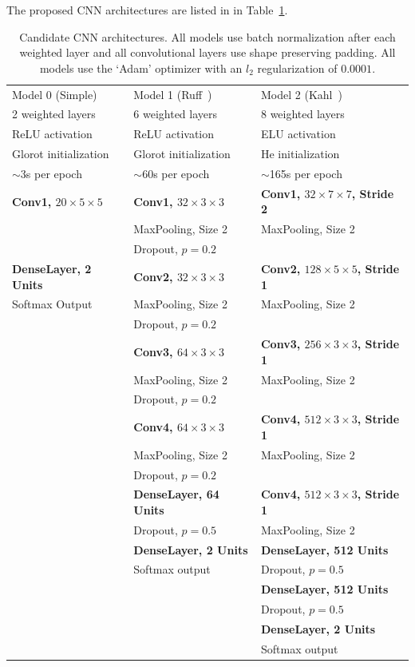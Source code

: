 The proposed CNN architectures are listed in in
Table~\ref{table:cnn_architectures}.

\begin{table}[ht]
\begin{center}
\begin{tabular}{l l l}
\toprule
Model 0 (Simple) & Model 1 (Ruff~\cite{ruff2020automated}) & Model 2 (Kahl~\cite{kahl2017large}) \\[0.5ex]
2 weighted layers & 6 weighted layers & 8 weighted layers \\[0.5ex]
ReLU activation & ReLU activation & ELU activation \\[0.5ex]
Glorot initialization & Glorot initialization & He initialization \\[0.5ex]
$\sim$3s per epoch & $\sim$60s per epoch & $\sim$165s per epoch \\[0.5ex]
\midrule
\textbf{Conv1, $20 \times 5 \times 5$} &
\textbf{Conv1, $32 \times 3 \times 3$} &
\textbf{Conv1, $32 \times 7 \times 7$, Stride 2} \\
& MaxPooling, Size 2 & MaxPooling, Size 2 \\
& Dropout, $p=0.2$ & \\[1ex]
\textbf{DenseLayer, 2 Units} &
\textbf{Conv2, $32 \times 3 \times 3$} &
\textbf{Conv2, $128 \times 5 \times 5$, Stride 1} \\
Softmax Output & MaxPooling, Size 2 & MaxPooling, Size 2 \\
& Dropout, $p=0.2$ & \\[1ex]
& \textbf{Conv3, $64 \times 3 \times 3$} &
\textbf{Conv3, $256 \times 3 \times 3$, Stride 1} \\
& MaxPooling, Size 2 & MaxPooling, Size 2 \\
& Dropout, $p=0.2$ & \\[1ex]
& \textbf{Conv4, $64 \times 3 \times 3$} &
\textbf{Conv4, $512 \times 3 \times 3$, Stride 1} \\
& MaxPooling, Size 2 & MaxPooling, Size 2 \\
& Dropout, $p=0.2$ & \\[1ex]
& \textbf{DenseLayer, 64 Units} &
\textbf{Conv4, $512 \times 3 \times 3$, Stride 1} \\
& Dropout, $p=0.5$ & MaxPooling, Size 2 \\[1ex]
& \textbf{DenseLayer, 2 Units} &
\textbf{DenseLayer, 512 Units} \\
& Softmax output & Dropout, $p=0.5$ \\[1ex]
& & \textbf{DenseLayer, 512 Units} \\
& & Dropout, $p=0.5$ \\[1ex]
& & \textbf{DenseLayer, 2 Units} \\
& & Softmax output \\[1ex]
\bottomrule
\end{tabular}
\caption{Candidate CNN architectures. All models use batch normalization after
each weighted layer and all convolutional layers use shape preserving
padding. All models use the `Adam' optimizer with an $l_2$ regularization of
$0.0001$.}\label{table:cnn_architectures}
\end{center}
\end{table}

